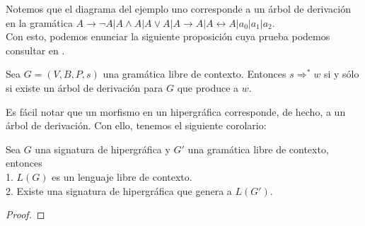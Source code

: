 \documentclass[../main.tex]{subfiles}
\begin{document}
Notemos que el diagrama del ejemplo uno corresponde a un árbol de derivación en la gramática $A \to \neg A | A \land A | A \lor A | A \to A | A \leftrightarrow A|a_0|a_1|a_2 $.\\ 
Con esto, podemos enunciar la siguiente proposición cuya prueba podemos consultar en . \\

\begin{prop}
	Sea $G=(V,B,P,s)$ una gramática libre de contexto. Entonces $s \Rightarrow ^* w$ si y sólo si existe un árbol de derivación para $G$ que produce a $w$. 
\end{prop}

Es fácil notar que un morfismo en un hipergráfica corresponde, de hecho, a un árbol de derivación. Con ello, tenemos el siguiente corolario:

\begin{thm}
	Sea $G$ una signatura de hipergráfica y $G'$ una gramática libre de contexto, entonces\\
	1. $L(G)$ es un lenguaje libre de contexto.\\
	2. Existe una signatura de hipergráfica que genera a $L(G')$. 
\end{thm}

\begin{proof}
\end{proof}
\end{document}
